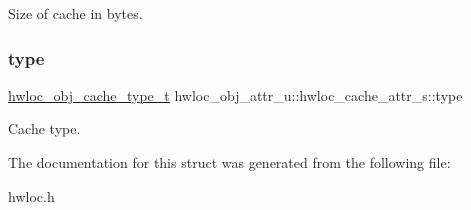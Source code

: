 Size of cache in bytes. 

\mbox{\label{a00254_ad8edc8ded2b7a70d6abbc874801930f4}} 
\subsubsection{\texorpdfstring{type}{type}}
{\footnotesize\ttfamily \hyperlink{a00184_gab6e1e7efedae8b341f3ee14fbe53d66c}{hwloc\+\_\+obj\+\_\+cache\+\_\+type\+\_\+t} hwloc\+\_\+obj\+\_\+attr\+\_\+u\+::hwloc\+\_\+cache\+\_\+attr\+\_\+s\+::type}



Cache type. 



The documentation for this struct was generated from the following file\+:\begin{DoxyCompactItemize}
\item 
hwloc.\+h\end{DoxyCompactItemize}
